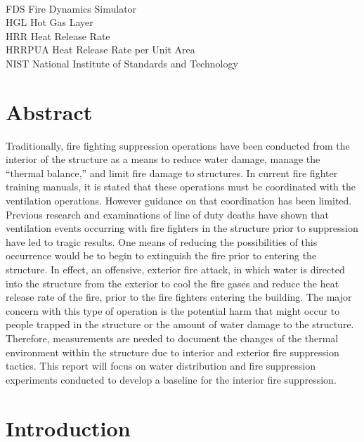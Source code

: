 \documentclass[12pt,oneside]{book}
\begin{document}
\begin{tabbing}
\hspace{1.5in} \= \\
FDS \> Fire Dynamics Simulator \\
HGL \> Hot Gas Layer \\
HRR \> Heat Release Rate \\
HRRPUA \> Heat Release Rate per Unit Area \\
NIST \> National Institute of Standards and Technology \\
\end{tabbing}
	
\mainmatter
	
\chapter{Abstract}
\label{chap:Abstract} 

Traditionally, fire fighting suppression operations have been conducted from the interior of the structure as a means to reduce water damage, manage the “thermal balance,” and limit fire damage to structures.  In current fire fighter training manuals, it is stated that these operations must be coordinated with the ventilation operations.  However guidance on that coordination has been limited.  Previous research and examinations of line of duty deaths have shown that ventilation events occurring with fire fighters in the structure prior to suppression have led to tragic results.  One means of reducing the possibilities of this occurrence would be to begin to extinguish the fire prior to entering the structure.  In effect, an offensive, exterior fire attack, in which water is directed into the structure from the exterior to cool the fire gases and reduce the heat release rate of the fire, prior to the fire fighters entering the building.  The major concern with this type of operation is the potential harm that might occur to people trapped in the structure or the amount of water damage to the structure.  Therefore, measurements are needed to document the changes of the thermal environment within the structure due to interior and exterior fire suppression tactics.  This report will focus on water distribution and fire suppression experiments conducted to develop a baseline for the interior fire suppression.

\chapter{Introduction}
\label{chap:Introduction}
     
\end{document}
